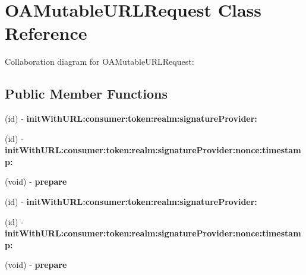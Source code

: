 \hypertarget{interface_o_a_mutable_u_r_l_request}{
\section{\-O\-A\-Mutable\-U\-R\-L\-Request \-Class \-Reference}
\label{interface_o_a_mutable_u_r_l_request}
}


\-Collaboration diagram for \-O\-A\-Mutable\-U\-R\-L\-Request\-:
\subsection*{\-Public \-Member \-Functions}
\begin{DoxyCompactItemize}
\item 
\hypertarget{interface_o_a_mutable_u_r_l_request_a788bccbe6575ee223ee198d26abb589e}{
(id) -\/ {\bfseries init\-With\-U\-R\-L\-:consumer\-:token\-:realm\-:signature\-Provider\-:}}
\label{interface_o_a_mutable_u_r_l_request_a788bccbe6575ee223ee198d26abb589e}

\item 
\hypertarget{interface_o_a_mutable_u_r_l_request_a6f3460b9be386fc40bd8ba6995fee771}{
(id) -\/ {\bfseries init\-With\-U\-R\-L\-:consumer\-:token\-:realm\-:signature\-Provider\-:nonce\-:timestamp\-:}}
\label{interface_o_a_mutable_u_r_l_request_a6f3460b9be386fc40bd8ba6995fee771}

\item 
\hypertarget{interface_o_a_mutable_u_r_l_request_a85905a8fd26337bdf3ffe76c118f42b9}{
(void) -\/ {\bfseries prepare}}
\label{interface_o_a_mutable_u_r_l_request_a85905a8fd26337bdf3ffe76c118f42b9}

\item 
\hypertarget{interface_o_a_mutable_u_r_l_request_a788bccbe6575ee223ee198d26abb589e}{
(id) -\/ {\bfseries init\-With\-U\-R\-L\-:consumer\-:token\-:realm\-:signature\-Provider\-:}}
\label{interface_o_a_mutable_u_r_l_request_a788bccbe6575ee223ee198d26abb589e}

\item 
\hypertarget{interface_o_a_mutable_u_r_l_request_a6f3460b9be386fc40bd8ba6995fee771}{
(id) -\/ {\bfseries init\-With\-U\-R\-L\-:consumer\-:token\-:realm\-:signature\-Provider\-:nonce\-:timestamp\-:}}
\label{interface_o_a_mutable_u_r_l_request_a6f3460b9be386fc40bd8ba6995fee771}

\item 
\hypertarget{interface_o_a_mutable_u_r_l_request_a85905a8fd26337bdf3ffe76c118f42b9}{
(void) -\/ {\bfseries prepare}}
\label{interface_o_a_mutable_u_r_l_request_a85905a8fd26337bdf3ffe76c118f42b9}


\end{DoxyCompactItemize}
